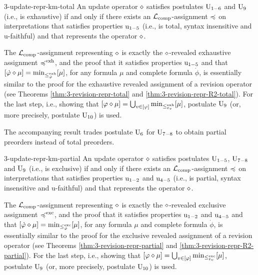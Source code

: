 \begin{thm}{\cite{KatsunoM91}}{3-update-repr-km-total}
	An update operator $\diamond$ satisfies postulates $\mathrm{U}_{1-6}$ and $\mathrm{U}_{9}$ 
	(i.e., is exhaustive)
	if and only if
	there exists an 
	$\mathcal{L}_{{\operatorname{comp}}}$-assignment $\preccurlyeq$ on interpretations
	that satisfies properties $\mathrm{u}_{1-5}$
	(i.e., is total, syntax insensitive and u-faithful)
	and that represents the operator $\diamond$.
\end{thm}
\begin{prf*}{}{}%
	The $\mathcal{L}_{{\operatorname{comp}}}$-assignment representing $\diamond$ is exactly 
	the $\diamond$-revealed exhaustive assignment $\preccurlyeq^{{\operatorname{exh}}}$, 
	and the proof that it satisfies properties $\mathrm{u}_{1-5}$
	and that $[\dot{\varphi}\diamond\mu] = {\operatorname{min}}_{\le^{{\operatorname{exh}}}_{\dot{\varphi}}}[\mu]$,
	for any formula $\mu$ and complete formula $\dot{\phi}$,
	is essentially similar to the proof for the exhaustive
	revealed assignment of a revision operator 
	(see Theorems \ref{thm:3-revision-repr-total} and \ref{thm:3-revision-repr-R2-total}).
	For the last step, i.e., showing that 	
	$[\varphi\diamond\mu]=\bigcup_{v\in[\varphi]}{\operatorname{min}}_{\le^{{\operatorname{exh}}}_{\varepsilon_{v}}}[\mu]$,
	postulate $\mathrm{U}_{9}$ (or, more precisely, postulate $\mathrm{U}_{10}$) is used.
\end{prf*}

The accompanying result trades postulate $\mathrm{U}_{6}$ for $\mathrm{U}_{7-8}$
to obtain partial preorders instead of total preorders.

\begin{thm}{\cite{KatsunoM91}}{3-update-repr-km-partial}
	An update operator $\diamond$ satisfies postulates $\mathrm{U}_{1-5}$, $\mathrm{U}_{7-8}$ and $\mathrm{U}_{9}$ 
	(i.e., is exclusive)
	if and only if
	there exists an 
	$\mathcal{L}_{{\operatorname{comp}}}$-assignment $\preccurlyeq$ on interpretations
	that satisfies properties $\mathrm{u}_{1-2}$ and $\mathrm{u}_{4-5}$
	(i.e., is partial, syntax insensitive and u-faithful)
	and that represents the operator $\diamond$.
\end{thm}
\begin{prf*}{}{}%
	The $\mathcal{L}_{{\operatorname{comp}}}$-assignment representing $\diamond$ is exactly 
	the $\diamond$-revealed exclusive assignment $\preccurlyeq^{{\operatorname{exc}}}$, 
	and the proof that it satisfies properties $\mathrm{u}_{1-2}$ and $\mathrm{u}_{4-5}$
	and that $[\dot{\varphi}\diamond\mu] = {\operatorname{min}}_{\le^{{\operatorname{exc}}}_{\dot{\varphi}}}[\mu]$,
	for any formula $\mu$ and complete formula $\dot{\phi}$,
	is essentially similar to the proof for the exclusive
	revealed assignment of a revision operator 
	(see Theorems \ref{thm:3-revision-repr-partial} and \ref{thm:3-revision-repr-R2-partial}).
	For the last step, i.e., showing that 	
	$[\varphi\diamond\mu]=\bigcup_{v\in[\varphi]}{\operatorname{min}}_{\le^{{\operatorname{exc}}}_{\varepsilon_{v}}}[\mu]$,
	postulate $\mathrm{U}_{9}$ (or, more precisely, postulate $\mathrm{U}_{10}$) is used.
\end{prf*}

